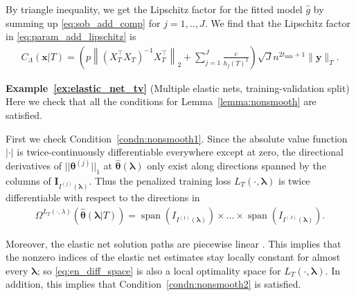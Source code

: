 \documentclass[10pt]{book}
\theoremstyle{definition}
\DeclareMathOperator{\spann}{span}
\begin{document}
	By triangle inequality, we get the Lipschitz factor for the fitted model $\hat{g}$ by summing up \eqref{eq:sob_add_comp} for $j = 1,..,J$.
	We find that the Lipschitz factor in \eqref{eq:param_add_lipschitz} is
	\begin{align}
	C_\Lambda(\boldsymbol{x} | T)
	=
	\left(
	p
	\left \|
	\left(
	X_T^\top X_T
	\right)^{-1}
	X_T^\top
	\right \|_2
	+
	\sum_{j=1}^J \frac{c }{h_j(T)^2}
	\right)
	\sqrt{J}
	n^{2t_{\min} + 1}
	\|\boldsymbol{y}\|_T.
	\label{eq:sobolev_lipschitz}
	\end{align}

\noindent\textbf{Example~\ref{ex:elastic_net_tv}} (Multiple elastic nets, training-validation split)
	Here we check that all the conditions for Lemma~\ref{lemma:nonsmooth} are satisfied.

	First we check Condition~\ref{condn:nonsmooth1}.
	Since the absolute value function $|\cdot|$ is twice-continuously differentiable everywhere except at zero, the directional derivatives of $||\boldsymbol \theta^{(j)}||_1$ at $\hat{\boldsymbol{\theta}}(\boldsymbol{\lambda})$ only exist along directions spanned by the columns of $\boldsymbol I_{I^{(j)}(\boldsymbol \lambda)}$.
	Thus the penalized training loss $L_T(\cdot, \boldsymbol{\lambda})$ is twice differentiable with respect to the directions in
	\begin{align}
	\Omega^{L_T(\cdot, \lambda)}(\hat{\boldsymbol{\theta}}(\boldsymbol{\lambda} | T))
	= \spann(I_{I^{(1)}(\boldsymbol \lambda)}) \times ... \times \spann(I_{I^{(J)}(\boldsymbol \lambda)}).
	\label{eq:en_diff_space}
	\end{align}

	Moreover, the elastic net solution paths are piecewise linear \citep{zou2003regression}.
	This implies that the nonzero indices of the elastic net estimates stay locally constant for almost every $\boldsymbol{\lambda}$; so \eqref{eq:en_diff_space} is also a local optimality space for $L_T(\cdot, \boldsymbol{\lambda})$.
	In addition, this implies that Condition~\ref{condn:nonsmooth2} is satisfied.
\end{document}
